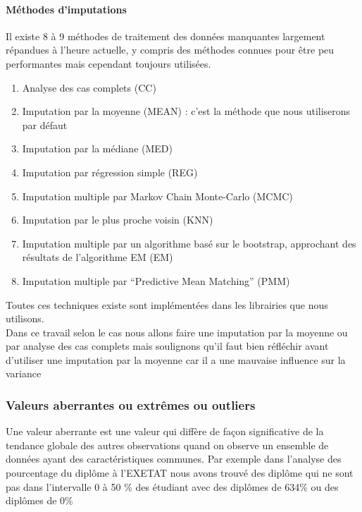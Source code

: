 \paragraph{Méthodes d'imputations} 

Il existe 8 à 9 méthodes de traitement des données manquantes
largement répandues à l'heure actuelle, y compris des méthodes connues
pour être peu performantes mais cependant toujours utilisées. 
\begin{enumerate}
	\item Analyse des cas complets (CC)
	\item Imputation par la moyenne (MEAN) : c'est la
	méthode que nous utiliserons par défaut
	\item Imputation par la médiane
	(MED)
	\item  Imputation par régression simple (REG)
	\item Imputation multiple par Markov Chain Monte-Carlo (MCMC)
	\item  Imputation par le plus proche
	voisin (KNN)
	\item Imputation multiple par un algorithme basé sur le
	bootstrap, approchant des résultats de l'algorithme EM (EM)
	\item Imputation multiple par ``Predictive Mean Matching'' (PMM)
\end{enumerate}
Toutes ces techniques existe sont implémentées dans les librairies que nous
utilisons.\\
Dans ce travail selon le cas nous allons faire une imputation par la
moyenne ou par analyse des cas complets mais soulignons qu'il faut bien
réfléchir avant d'utiliser une imputation par la moyenne car il a une
mauvaise influence sur la variance
\subsubsection{Valeurs aberrantes ou extrêmes ou outliers}
Une valeur aberrante est une valeur qui diffère de façon significative
de la tendance globale des autres observations quand on observe un
ensemble de données ayant des caractéristiques communes. Par exemple
dans l'analyse des pourcentage du diplôme à l'EXETAT nous avons trouvé
des diplôme qui ne sont pas dans l'intervalle 0 à 50 \% des étudiant
avec des diplômes de 634\% ou des diplômes de 0\%

